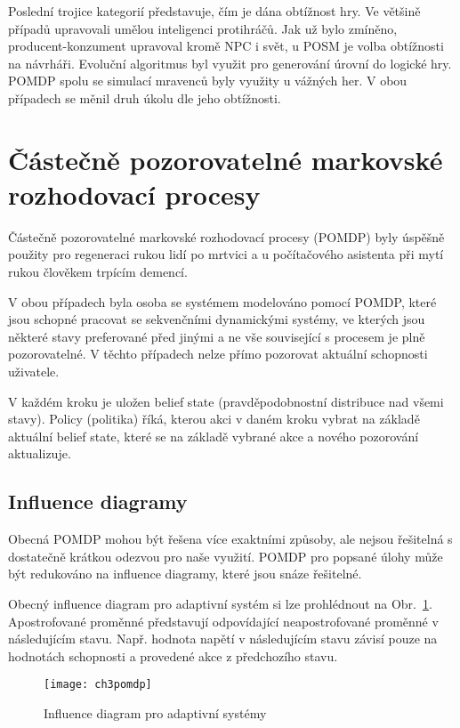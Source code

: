 Poslední trojice kategorií představuje, čím je dána obtížnost hry. Ve většině případů upravovali umělou inteligenci protihráčů. Jak už bylo zmíněno, producent-konzument upravoval kromě NPC i svět, u POSM je volba obtížnosti na návrháři. Evoluční algoritmus byl využit pro generování úrovní do logické hry. POMDP spolu se simulací mravenců byly využity u vážných her. V obou případech se měnil druh úkolu dle jeho obtížnosti.

\section{Částečně pozorovatelné markovské rozhodovací procesy} \label{sec:POMDP}

Částečně pozorovatelné markovské rozhodovací procesy (POMDP) byly úspěšně použity pro regeneraci rukou lidí po mrtvici \cite{9Pomdp} a u počítačového asistenta při mytí rukou člověkem trpícím demencí.

V obou případech byla osoba se systémem modelováno pomocí POMDP, které jsou schopné pracovat se sekvenčními dynamickými systémy, ve kterých jsou některé stavy preferované před jinými a ne vše související s procesem je plně pozorovatelné. V těchto případech nelze přímo pozorovat aktuální schopnosti uživatele.

V každém kroku je uložen belief state (pravděpodobnostní distribuce nad všemi stavy). Policy (politika) říká, kterou akci v daném kroku vybrat na základě aktuální belief state, které se na základě vybrané akce a nového pozorování aktualizuje.

\subsection{Influence diagramy}

Obecná POMDP mohou být řešena více exaktními způsoby, ale nejsou řešitelná s dostatečně krátkou odezvou pro naše využití. POMDP pro popsané úlohy může být redukováno na influence diagramy, které jsou snáze řešitelné.
 
Obecný influence diagram pro adaptivní systém si lze prohlédnout na Obr.~\ref{fig:ch3pomdp}. Apostrofované proměnné představují odpovídající neapostrofované proměnné v následujícím stavu. Např. hodnota napětí v následujícím stavu závisí pouze na hodnotách schopnosti a provedené akce z předchozího stavu.

\begin{figure}
  \centering
  \texttt{[image: ch3pomdp]}
	\caption{Influence diagram pro adaptivní systémy}
	\label{fig:ch3pomdp}
\end{figure}

